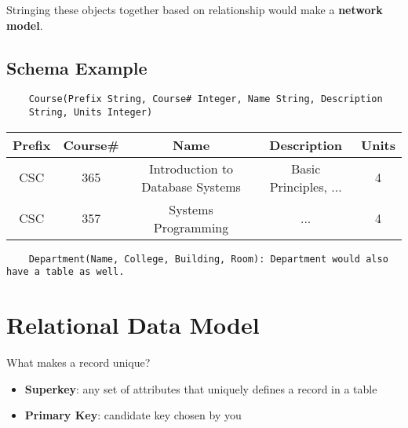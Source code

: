 \documentclass[twoside]{article}
\begin{document}
Stringing these objects together based on relationship would 
make a \textbf{network model}.

\subsection*{Schema Example}
\begin{verbatim}
    Course(Prefix String, Course# Integer, Name String, Description
    String, Units Integer)
\end{verbatim}

\begin{table}[h]
    \centering
    \begin{tabular}{|c|c|c|c|c|}
        \hline
        Prefix & Course\# & Name & Description & Units \\
        \hline
        CSC & 365 & Introduction to Database Systems & Basic Principles, ... & 4 \\
        \hline
        CSC & 357 & Systems Programming & ... & 4 \\
        \hline
    \end{tabular}
\end{table}

\begin{verbatim}
    Department(Name, College, Building, Room): Department would also have a table as well.
\end{verbatim}

\newpage
\hfill \break 
{}

\section*{Relational Data Model}

What makes a record unique?
\begin{itemize}
    \item \textbf{Superkey}: any set of attributes that uniquely defines a 
    record in a table
    \item \textbf{Primary Key}: candidate key chosen by you
\end{itemize}
\end{document}
